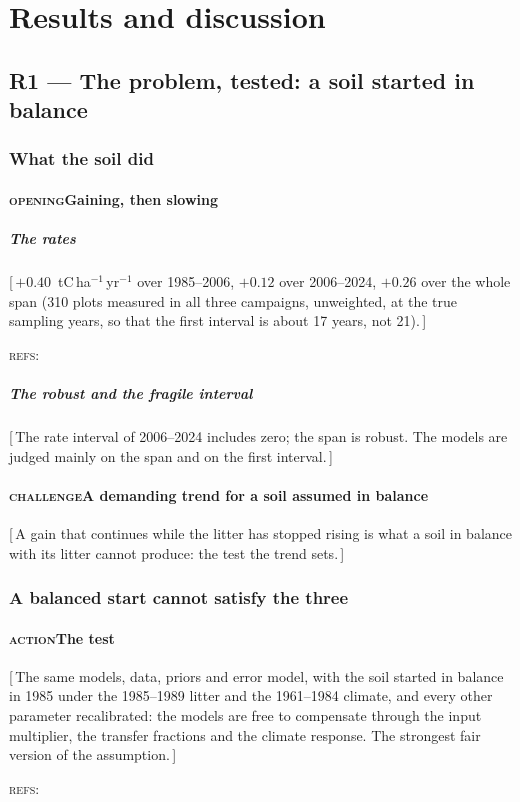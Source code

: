\documentclass[11pt]{article}
\newcounter{subsubparagraph}[subparagraph]
\newcommand{\beat}[1]{\textcolor{black!45}{\textsc{\small #1}}\enspace}
\newcommand{\gap}[1]{\textcolor{red!70!black}{\small[\,#1\,]}}
\newcommand{\refs}[1]{\par\textcolor{red!70!black}{\footnotesize\textsc{refs:}\ #1}\par}
\begin{document}
\section{Results and discussion}\label{sec:results}

\subsection{R1 --- The problem, tested: a soil started in balance}\label{sec:r1}

\subsubsection{What the soil did}
\paragraph{\beat{opening}Gaining, then slowing}
\subparagraph{The rates}
\gap{$+0.40$~tC\,ha$^{-1}$\,yr$^{-1}$ over 1985--2006, $+0.12$ over 2006--2024, $+0.26$ over the
whole span (310 plots measured in all three campaigns, unweighted, at the true sampling years,
so that the first interval is about 17 years, not 21).}
\refs{\citet{Kramarenko}}
\subparagraph{The robust and the fragile interval}
\gap{The rate interval of 2006--2024 includes zero; the span is robust. The models are judged
mainly on the span and on the first interval.}
\paragraph{\beat{challenge}A demanding trend for a soil assumed in balance}
\gap{A gain that continues while the litter has stopped rising is what a soil in balance with
its litter cannot produce: the test the trend sets.}

\subsubsection{A balanced start cannot satisfy the three}
\paragraph{\beat{action}The test}
\gap{The same models, data, priors and error model, with the soil started in balance in 1985
under the 1985--1989 litter and the 1961--1984 climate, and every other parameter recalibrated:
the models are free to compensate through the input multiplier, the transfer fractions and the
climate response. The strongest fair version of the assumption.}
\refs{\citet{Wutzler2007}}
\end{document}
